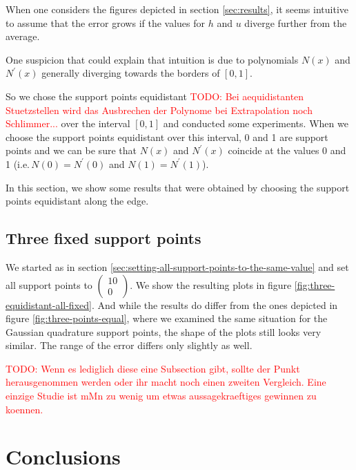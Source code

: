 \documentclass{article}
\newcommand{\todo}[2][]{\textcolor{red}{TODO\ifthenelse{\equal{#1}{}}{}{[#1]}: #2}}
\begin{document}
When one considers the figures depicted in section \ref{sec:results}, it seems intuitive to assume that the error grows if the values for $h$ and $u$ diverge further from the average.

One suspicion that could explain that intuition is due to polynomials $N\left(x\right)$ and $N^\prime\left(x\right)$ generally diverging towards the borders of $[0,1]$.

So we chose the support points equidistant \todo{Bei aequidistanten Stuetzstellen wird das Ausbrechen der Polynome bei Extrapolation noch Schlimmer...} over the interval $[0,1]$ and conducted some experiments. When we choose the support points equidistant over this interval, 0 and 1 are support points and we can be sure that $N\left(x\right)$ and $N^\prime\left(x\right)$ coincide at the values 0 and 1 (i.e.\,$N\left(0\right)=N^\prime\left(0\right)$ and $N\left(1\right)=N^\prime\left(1\right)$).

In this section, we show some results that were obtained by choosing the support points equidistant along the edge.

\subsection{Three fixed support points}
\label{sec:equidistant-three-fixed}

We started as in section \ref{sec:setting-all-support-points-to-the-same-value} and set all support points to $
\begin{pmatrix}
  10 \\ 0
\end{pmatrix}$. We show the resulting plots in figure \ref{fig:three-equidistant-all-fixed}. And while the results do differ from the ones depicted in figure \ref{fig:three-points-equal}, where we examined the same situation for the Gaussian quadrature support points, the shape of the plots still looks very similar. The range of the error differs only slightly as well.



\todo{Wenn es lediglich diese eine Subsection gibt, sollte der Punkt herausgenommen werden oder ihr macht noch einen zweiten Vergleich. Eine einzige Studie ist mMn zu wenig um etwas aussagekraeftiges gewinnen zu koennen.}



\section{Conclusions}
\label{sec:conslusions}
\end{document}
